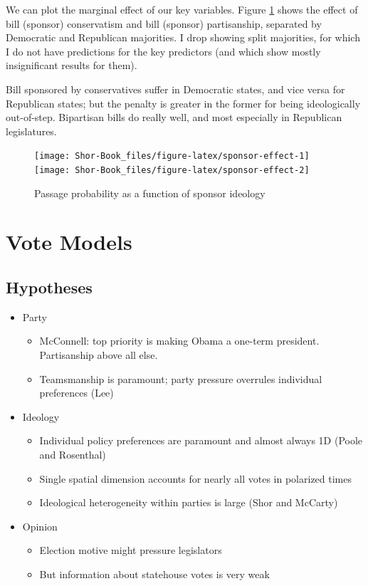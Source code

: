 \documentclass[
  oneside]{book}
\providecommand{\tightlist}{%
  \setlength{\itemsep}{0pt}\setlength{\parskip}{0pt}}
\begin{document}
We can plot the marginal effect of our key variables. Figure \ref{fig:sponsor-effect} shows the effect of bill (sponsor) conservatism and bill (sponsor) partisanship, separated by Democratic and Republican majorities. I drop showing split majorities, for which I do not have predictions for the key predictors (and which show mostly insignificant results for them).

Bill sponsored by conservatives suffer in Democratic states, and vice versa for Republican states; but the penalty is greater in the former for being ideologically out-of-step. Bipartisan bills do really well, and most especially in Republican legislatures.

\begin{figure}
\texttt{[image: Shor-Book\_files/figure-latex/sponsor-effect-1]} \texttt{[image: Shor-Book\_files/figure-latex/sponsor-effect-2]} \caption{Passage probability as a function of sponsor ideology}\label{fig:sponsor-effect}
\end{figure}

\hypertarget{vote-models}{%
\chapter{Vote Models}\label{vote-models}}

\hypertarget{hypotheses-1}{%
\section{Hypotheses}\label{hypotheses-1}}

\begin{itemize}
\tightlist
\item
  Party

  \begin{itemize}
  \tightlist
  \item
    McConnell: top priority is making Obama a one-term president. Partisanship above all else.
  \item
    Teamsmanship is paramount; party pressure overrules individual preferences (Lee)
  \end{itemize}
\item
  Ideology

  \begin{itemize}
  \tightlist
  \item
    Individual policy preferences are paramount and almost always 1D (Poole and Rosenthal)
  \item
    Single spatial dimension accounts for nearly all votes in polarized times
  \item
    Ideological heterogeneity within parties is large (Shor and McCarty)
  \end{itemize}
\item
  Opinion

  \begin{itemize}
  \tightlist
  \item
    Election motive might pressure legislators
  \item
    But information about statehouse votes is very weak
  \end{itemize}
\end{itemize}
\end{document}
